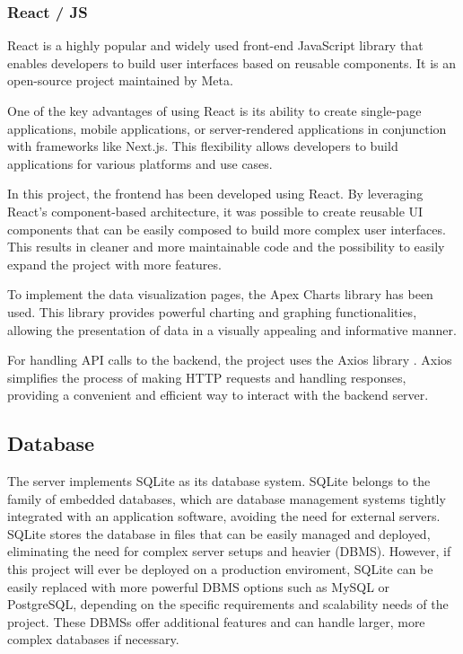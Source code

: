 \documentclass[a4paper, 11pt]{article}
\begin{document}
\subsubsection{React / JS}
React \cite{react} is a highly popular and widely used front-end JavaScript library that enables developers to build user interfaces based on reusable components. It is an open-source project maintained by Meta.

One of the key advantages of using React is its ability to create single-page applications, mobile applications, or server-rendered applications in conjunction with frameworks like Next.js. This flexibility allows developers to build applications for various platforms and use cases.

In this project, the frontend has been developed using React. By leveraging React's component-based architecture, it was possible to create reusable UI components that can be easily composed to build more complex user interfaces. This results in cleaner and more maintainable code and the possibility to easily expand the project with more features.

To implement the data visualization pages, the Apex Charts library \cite{apexcharts} has been used. This library provides powerful charting and graphing functionalities, allowing the presentation of data in a visually appealing and informative manner.

For handling API calls to the backend, the project uses the Axios library \cite{axios}. Axios simplifies the process of making HTTP requests and handling responses, providing a convenient and efficient way to interact with the backend server.

\subsection{Database}
The server implements SQLite \cite{sqlite} as its database system. SQLite belongs to the family of embedded databases, which are database management systems tightly integrated with an application software, avoiding the need for external servers. SQLite stores the database in files that can be easily managed and deployed, eliminating the need for complex server setups and heavier (DBMS). 
However, if this project will ever be deployed on a production enviroment, SQLite can be easily replaced with more powerful DBMS options such as MySQL or PostgreSQL, depending on the specific requirements and scalability needs of the project. These DBMSs offer additional features and can handle larger, more complex databases if necessary.
\end{document}
